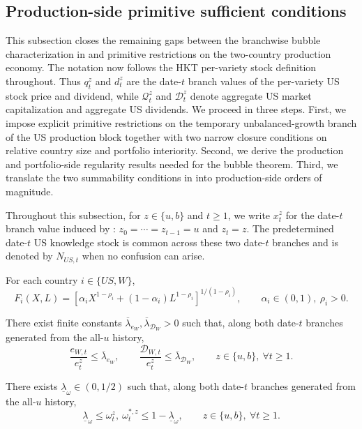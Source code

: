 \documentclass{article}
\begin{document}
\subsection{Production-side primitive sufficient conditions}

This subsection closes the remaining gaps between the branchwise bubble characterization in  and primitive restrictions on the two-country production economy. The notation now follows the HKT per-variety stock definition throughout. Thus $q_t^z$ and $d_t^z$ are the date-$t$ branch values of the per-variety US stock price and dividend, while $\mathcal Q_t^z$ and $\mathcal D_t^z$ denote aggregate US market capitalization and aggregate US dividends. We proceed in three steps. First, we impose explicit primitive restrictions on the temporary unbalanced-growth branch of the US production block together with two narrow closure conditions on relative country size and portfolio interiority. Second, we derive the production and portfolio-side regularity results needed for the bubble theorem. Third, we translate the two summability conditions in  into production-side orders of magnitude.

Throughout this subsection, for $z\in\{u,b\}$ and $t\ge 1$, we write $x_t^z$ for the date-$t$ branch value induced by : $z_0=\cdots=z_{t-1}=u$ and $z_t=z$. The predetermined date-$t$ US knowledge stock is common across these two date-$t$ branches and is denoted by $N_{US,t}$ when no confusion can arise.

\begin{ass}\label{ass_ces_two_country}
For each country $i\in\{US,W\}$,
\[
F_i(X,L)=\left[\alpha_i X^{1-\rho_i}+(1-\alpha_i)L^{1-\rho_i}\right]^{1/(1-\rho_i)},
\qquad
\alpha_i\in(0,1),\ \rho_i>0.
\]
\end{ass}

\begin{ass}\label{ass_relative_dividend_bounds}
There exist finite constants $\overline\lambda_{e_W},\overline\lambda_{\mathcal D_W}>0$ such that, along both date-$t$ branches generated from the all-$u$ history,
\[
\frac{e_{W,t}}{e_t^z}\le \overline\lambda_{e_W},
\qquad
\frac{\mathcal D_{W,t}}{e_t^z}\le \overline\lambda_{\mathcal D_W},
\qquad
z\in\{u,b\},\ \forall t\ge 1.
\]
\end{ass}

\begin{ass}\label{ass_interior_equity_weights}
There exists $\underline\lambda_\omega\in(0,1/2)$ such that, along both date-$t$ branches generated from the all-$u$ history,
\[
\underline\lambda_\omega
\le
\omega_t^z,\ \omega_t^{*,z}
\le
1-\underline\lambda_\omega,
\qquad
z\in\{u,b\},\ \forall t\ge 1.
\]
\end{ass}
\end{document}
